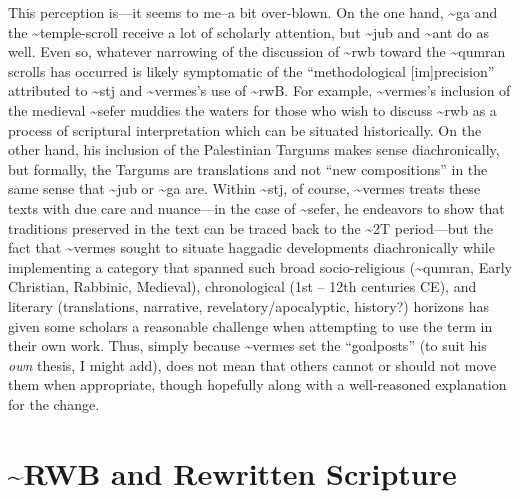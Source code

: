 This perception is---it seems to me--a bit over-blown. On the one hand,
\textasciitilde{}ga and the \textasciitilde{}temple-scroll receive a lot
of scholarly attention, but \textasciitilde{}jub and
\textasciitilde{}ant do as well. Even so, whatever narrowing of the
discussion of \textasciitilde{}rwb toward the \textasciitilde{}qumran
scrolls has occurred is likely symptomatic of the ``methodological
{[}im{]}precision'' attributed to \textasciitilde{}stj and
\textasciitilde{}vermes's use of \textasciitilde{}rwB. For example,
\textasciitilde{}vermes's inclusion of the medieval
\textasciitilde{}sefer muddies the waters for those who wish to discuss
\textasciitilde{}rwb as a process of scriptural interpretation which can
be situated historically. On the other hand, his inclusion of the
Palestinian Targums makes sense diachronically, but formally, the
Targums are translations and not ``new compositions'' in the same sense
that \textasciitilde{}jub or \textasciitilde{}ga are. Within
\textasciitilde{}stj, of course, \textasciitilde{}vermes treats these
texts with due care and nuance---in the case of \textasciitilde{}sefer,
he endeavors to show that traditions preserved in the text can be traced
back to the \textasciitilde{}2T period---but the fact that
\textasciitilde{}vermes sought to situate haggadic developments
diachronically while implementing a category that spanned such broad
socio-religious (\textasciitilde{}qumran, Early Christian, Rabbinic,
Medieval), chronological (1st -- 12th centuries CE), and literary
(translations, narrative, revelatory/apocalyptic, history?) horizons has
given some scholars a reasonable challenge when attempting to use the
term in their own work. Thus, simply because \textasciitilde{}vermes set
the ``goalposts'' (to suit his \emph{own} thesis, I might add), does not
mean that others cannot or should not move them when appropriate, though
hopefully along with a well-reasoned explanation for the change.

\hypertarget{rwb-and-rewritten-scripture}{%
\section{\textasciitilde{}RWB and Rewritten
Scripture}\label{rwb-and-rewritten-scripture}}

